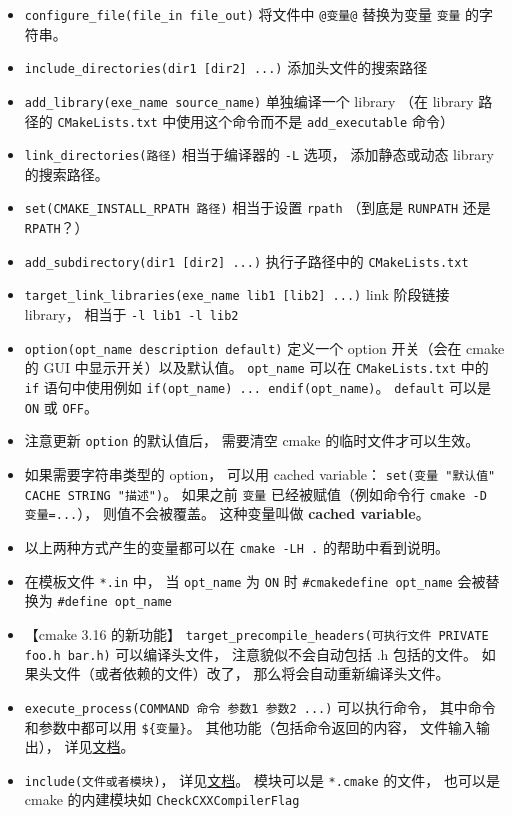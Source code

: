 \begin{itemize}
\item \verb`configure_file(file_in file_out)` 将文件中 \verb`@变量@` 替换为变量 \verb`变量` 的字符串。
\item \verb`include_directories(dir1 [dir2] ...)` 添加头文件的搜索路径
\item \verb`add_library(exe_name source_name)` 单独编译一个 library （在 library 路径的 \verb|CMakeLists.txt| 中使用这个命令而不是 \verb`add_executable` 命令）
\item \verb|link_directories(路径)| 相当于编译器的 \verb`-L` 选项， 添加静态或动态 library 的搜索路径。
\item \verb|set(CMAKE_INSTALL_RPATH 路径)| 相当于设置 \verb|rpath| （到底是 \verb|RUNPATH| 还是 \verb|RPATH|？）
\item \verb`add_subdirectory(dir1 [dir2] ...)` 执行子路径中的 \verb|CMakeLists.txt|
\item \verb`target_link_libraries(exe_name lib1 [lib2] ...)` link 阶段链接 library， 相当于 \verb|-l lib1 -l lib2|
\item \verb`option(opt_name description default)` 定义一个 option 开关（会在 cmake 的 GUI 中显示开关）以及默认值。 \verb`opt_name` 可以在 \verb|CMakeLists.txt| 中的 \verb`if` 语句中使用例如 \verb`if(opt_name) ... endif(opt_name)`。 \verb`default` 可以是 \verb`ON` 或 \verb`OFF`。
\item 注意更新 \verb|option| 的默认值后， 需要清空 cmake 的临时文件才可以生效。
\item 如果需要字符串类型的 option， 可以用 cached variable： \verb|set(变量 "默认值" CACHE STRING "描述")|。 如果之前 \verb|变量| 已经被赋值（例如命令行 \verb|cmake -D 变量=...|）， 则值不会被覆盖。 这种变量叫做 \textbf{cached variable}。
\item 以上两种方式产生的变量都可以在 \verb|cmake -LH .| 的帮助中看到说明。
\item 在模板文件 \verb`*.in` 中， 当 \verb`opt_name` 为 \verb`ON` 时 \verb`#cmakedefine opt_name` 会被替换为 \verb`#define opt_name`
\item 【cmake 3.16 的新功能】 \verb|target_precompile_headers(可执行文件 PRIVATE foo.h bar.h)| 可以编译头文件， 注意貌似不会自动包括 .h 包括的文件。 如果头文件（或者依赖的文件）改了， 那么将会自动重新编译头文件。
\item \verb|execute_process(COMMAND 命令 参数1 参数2 ...)| 可以执行命令， 其中命令和参数中都可以用 \verb|${变量}|。 其他功能（包括命令返回的内容， 文件输入输出）， 详见\href{https://cmake.org/cmake/help/latest/command/execute_process.html}{文档}。
\item \verb|include(文件或者模块)|， 详见\href{https://cmake.org/cmake/help/latest/command/include.html}{文档}。 模块可以是 \verb|*.cmake| 的文件， 也可以是 cmake 的内建模块如 \verb|CheckCXXCompilerFlag|

\end{itemize}
